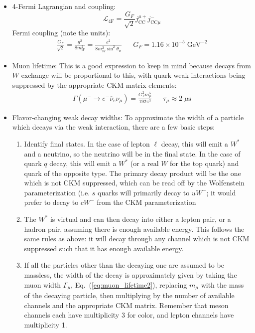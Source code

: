 \documentclass[11pt, oneside]{article}   	%
\theoremstyle{definition}
\numberwithin{equation}{subsection}		%
\begin{document}
\begin{itemize}
	\item 4-Fermi Lagrangian and coupling:
	\begin{equation}
		\mathcal L_\mathrm{4F} = \frac{G_F}{\sqrt 2} j_\mathrm{CC}^{\mu +} j_{\mathrm{CC} \mu}^-
	\end{equation}
	Fermi coupling (note the units):
	\begin{align}
		\frac{G_F}{\sqrt 2} = \frac{g^2}{8m_W^2} = \frac{e^2}{8 m_W^2\sin^2\theta_w} && G_F = 1.16\times 10^{-5}\;\mathrm{GeV}^{-2}
	\end{align}
	
	\item Muon lifetime: This is a good expression to keep in mind because decays from $W$ exchange will be proportional to this, 
	with quark weak interactions being suppressed by the appropriate CKM matrix elements:
	\begin{align}
		\Gamma(\mu^-\rightarrow e^- \overline\nu_e \nu_\mu) = \frac{G_F^2 m_\mu^5}{192\pi^3} && \tau_\mu\approx 2\;\mu\mathrm{s}
		\label{eq:muon_lifetime2}
	\end{align}
	
	\item Flavor-changing weak decay widths: To approximate the width of a particle which decays via the weak interaction, there are a few 
	basic steps:
	\begin{enumerate}
		\item Identify final states. In the case of lepton $\ell$ decay, this will emit a $W^*$ and a neutrino, so the neutrino will be 
		in the final state. In the case of quark $q$ decay, this will emit a $W^*$ (or a real $W$ for the top quark) and quark of the 
		opposite type. The primary decay product will be the one which is not CKM suppressed, which can be read off by the 
		Wolfenstein parameterization (i.e. $s$ quarks will primarily decay to $u W^-$; it would prefer to decay to $c W^-$ from the 
		CKM parameterization
		\item The $W^*$ is virtual and can then decay into either a lepton pair, or a hadron pair, assuming there is enough 
		available energy. This follows the same rules as above: it will decay through any channel which is not CKM suppressed 
		such that it has enough available energy.
		\item If all the particles other than the decaying one are assumed to be massless, the width of the decay is approximately 
		given by taking the muon width $\Gamma_\mu$, Eq.~(\ref{eq:muon_lifetime2}), replacing $m_\mu$ with the 
		mass of the decaying particle, then multiplying by the number of available channels and the appropriate CKM matrix. 
		Remember that meson channels each have multiplicity 3 for color, and lepton channels have multiplicity 1.
	\end{enumerate}

\end{itemize}
\end{document}
